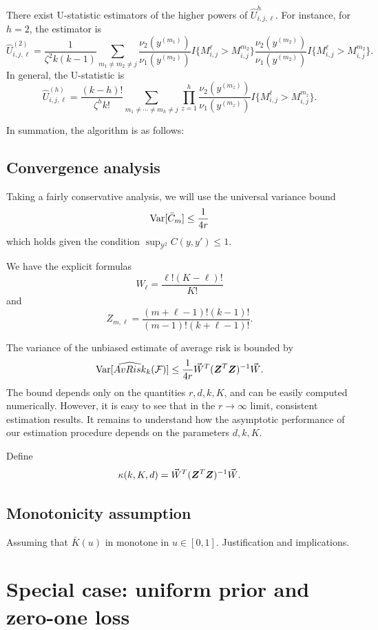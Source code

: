 \documentclass[12pt]{article}
\begin{document}
There exist U-statistic estimators of the higher powers of
$\hat{U}_{i,j,\ell}^h$.  For instance, for $h=2$, the estimator is
\[
\hat{U}_{i,j,\ell}^{(2)} = \frac{1}{\zeta^2 k(k-1)} \sum_{m_1\neq m_2 \neq j}  \frac{\nu_2(y^{(m_1)})}{\nu_1(y^{(m_2)})} I\{M_{i, j}^\ell > M_{i, j}^{m_2}\}
 \frac{\nu_2(y^{(m_2)})}{\nu_1(y^{(m_2)})} I\{M_{i, j}^\ell > M_{i, j}^{m_2}\}.
\]
In general, the U-statistic is
\[
\hat{U}_{i, j, \ell}^{(h)} = \frac{(k-h)!}{\zeta^h k!} \sum_{m_1 \neq \cdots \neq m_h \neq j} \prod_{z=1}^h  \frac{\nu_2(y^{(m_z)})}{\nu_1(y^{(m_z)})} I\{M_{i, j}^\ell > M_{i, j}^{m_z}\}.
\]

In summation, the algorithm is as follows:


\subsection{Convergence analysis}



Taking a fairly conservative analysis, we will use the universal variance bound
\[
\text{Var}[\bar{C}_m] \leq \frac{1}{4r}
\]
which holds given the condition $\sup_{\mathcal{Y}^2} C(y, y') \leq 1.$

We have the explicit formulas
\[
W_\ell = \frac{\ell!(K-\ell)!}{K!}
\]
and
\[
Z_{m, \ell} = \frac{(m+\ell-1)!(k-1)!}{(m-1)!(k+\ell-1)!}.
\]

The variance of the unbiased estimate of average risk is bounded by
\[
\text{Var}[\widehat{AvRisk}_k(\mathcal{F})] \leq \frac{1}{4r} \vec{W}^T (\boldsymbol{Z}^T \boldsymbol{Z})^{-1} \vec{W}.
\]
The bound depends only on the quantities $r, d, k, K$, and can be
easily computed numerically.  However, it is easy to see that in the
$r \to \infty$ limit, consistent estimation results.  It remains to
understand how the asymptotic performance of our estimation procedure
depends on the parameters $d, k, K$.

Define
\[
\kappa(k, K, d) = \vec{W}^T (\boldsymbol{Z}^T \boldsymbol{Z})^{-1} \vec{W}.
\]


\subsection{Monotonicity assumption}

Assuming that $\bar{K}(u)$ in monotone in $u \in [0,1]$.
Justification and implications.

\section{Special case: uniform prior and zero-one loss}\label{sec:sp_case}
\end{document}
